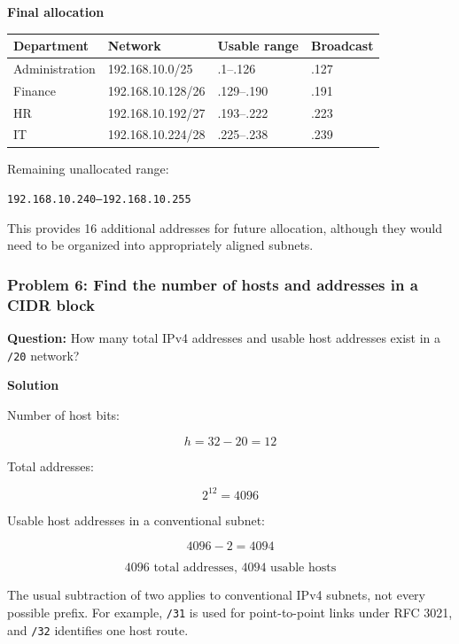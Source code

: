 \textbf{Final allocation}

\begin{center}
\begin{tabularx}{\linewidth}{p{3cm} p{3cm} p{2.5cm} X}
\toprule
\textbf{Department} & \textbf{Network} & \textbf{Usable range} & \textbf{Broadcast} \\
\midrule
Administration & 192.168.10.0/25 & .1--.126 & .127 \\
Finance & 192.168.10.128/26 & .129--.190 & .191 \\
HR & 192.168.10.192/27 & .193--.222 & .223 \\
IT & 192.168.10.224/28 & .225--.238 & .239 \\
\bottomrule
\end{tabularx}
\end{center}

Remaining unallocated range:

\texttt{192.168.10.240--192.168.10.255}

This provides 16 additional addresses for future allocation, although they would need to be organized into appropriately aligned subnets.

\subsubsection*{Problem 6: Find the number of hosts and addresses in a CIDR block}

\textbf{Question:} How many total IPv4 addresses and usable host addresses exist in a \texttt{/20} network?

\textbf{Solution}

Number of host bits:



\[
h=32-20=12
\]



Total addresses:



\[
2^{12}=4096
\]



Usable host addresses in a conventional subnet:



\[
4096-2=4094
\]





\[
\boxed{4096\text{ total addresses, }4094\text{ usable hosts}}
\]



The usual subtraction of two applies to conventional IPv4 subnets, not every possible prefix. For example, \texttt{/31} is used for point-to-point links under RFC 3021, and \texttt{/32} identifies one host route.

